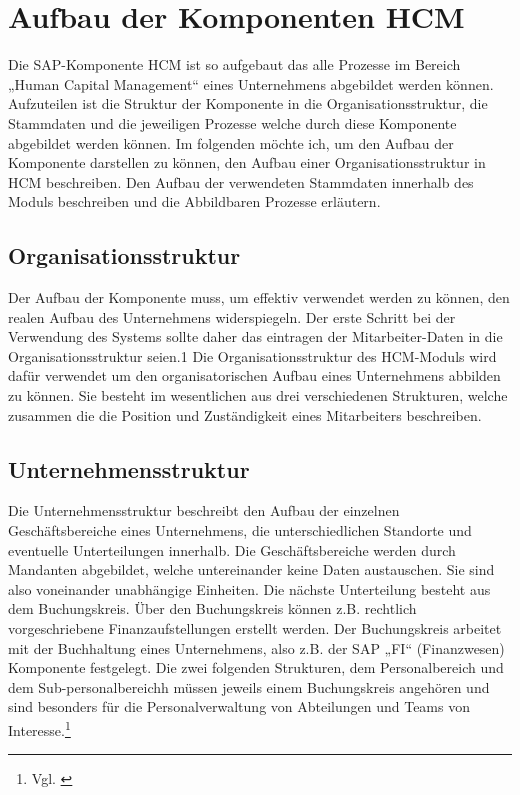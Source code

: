 
\section{Aufbau der Komponenten HCM} 
\label{sec:aufbauderkomponenten}

Die SAP-Komponente HCM ist so aufgebaut das alle Prozesse im Bereich „Human Capital Management“ eines Unternehmens abgebildet werden können. Aufzuteilen ist die Struktur der Komponente in die Organisationsstruktur, die Stammdaten und die jeweiligen Prozesse welche durch diese Komponente abgebildet werden können. Im folgenden möchte ich, um den Aufbau der Komponente darstellen zu können, den Aufbau einer Organisationsstruktur in HCM beschreiben. Den Aufbau der verwendeten Stammdaten innerhalb des Moduls beschreiben und die Abbildbaren Prozesse erläutern.

\subsection{Organisationsstruktur}
Der Aufbau der Komponente muss, um effektiv verwendet werden zu können, den realen Aufbau des Unternehmens widerspiegeln. Der erste Schritt bei der Verwendung des Systems sollte daher das eintragen der Mitarbeiter-Daten in die Organisationsstruktur seien.1 Die Organisationsstruktur des HCM-Moduls wird dafür verwendet um den organisatorischen Aufbau eines Unternehmens abbilden zu können. Sie besteht im wesentlichen aus drei verschiedenen Strukturen, welche zusammen die die Position und Zuständigkeit eines Mitarbeiters beschreiben. 

\subsection{Unternehmensstruktur}
Die Unternehmensstruktur beschreibt den Aufbau der einzelnen Geschäftsbereiche eines Unternehmens, die unterschiedlichen Standorte und eventuelle Unterteilungen innerhalb. Die Geschäftsbereiche werden durch Mandanten abgebildet, welche untereinander keine Daten austauschen. Sie sind also voneinander unabhängige Einheiten. Die nächste Unterteilung besteht aus dem Buchungskreis. Über den Buchungskreis können z.B. rechtlich vorgeschriebene Finanzaufstellungen erstellt werden. Der Buchungskreis arbeitet mit der Buchhaltung eines Unternehmens, also z.B. der SAP „FI“ (Finanzwesen) Komponente festgelegt. Die zwei folgenden Strukturen, dem Personalbereich und dem Sub-personalbereichh müssen jeweils einem Buchungskreis angehören und sind besonders für die Personalverwaltung von Abteilungen und Teams von Interesse.\footnote{Vgl. \cite{SAPSE2024a}}

